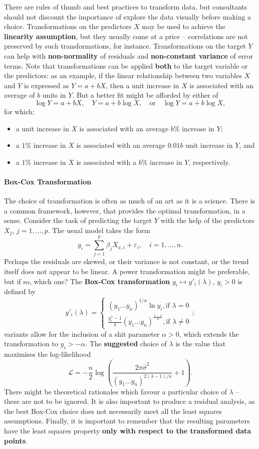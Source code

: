 \afterpage{\FloatBarrier}
There are rules of thumb and best practices to transform data, but consultants should not discount the importance of explore the data visually before making a choice. \newl Transformations on the predictors $X$ may be used to achieve the \textbf{linearity assumption}, but they usually come at a price -- correlations are not preserved by such transformations, for instance. Transformations on the target $Y$ can help with \textbf{non-normality} of residuals and \textbf{non-constant variance} of error terms. Note that transformations can be applied \textbf{both} to the target variable or the predictors: as an example, if the linear relationship between two variables $X$ and $Y$ is expressed as $Y=a+bX$, then a unit increase in $X$ is associated with an average of $b$ units in $Y$. But a better fit might be afforded by either of $$\log Y = a+bX,\quad Y=a+b\log X,\quad \mbox{or}\quad  \log Y = a+b\log X,$$ for which:
\begin{itemize}[noitemsep]
\item a unit increase in $X$ is associated with an average $b\%$ increase in $Y$;
\item a $1\%$ increase in $X$ is associated with an average $0.01b$ unit increase in $Y$, and
\item a $1\%$ increase in $X$ is associated with a $b\%$ increase in $Y$, respectively. 
\end{itemize}
\paragraph{Box-Cox Transformation} The choice of transformation is often as much of an art as it is a science. There is a common  framework, however, that provides the  optimal transformation, in a sense. Consider the task of predicting the target $Y$ with the help of the predictors $X_j$, $j=1,\ldots, p$. The usual model takes the form $$y_i=\sum_{j=1}^p\beta_jX_{x,i}+\varepsilon_i,\quad i=1,\ldots, n.$$ Perhaps the residuals are skewed, or their variance is not constant, or the trend itself does not appear to be linear. A power transformation might be preferable, but if so,  which one? \newl The \textbf{Box-Cox transformation} $y_i\mapsto y'_i(\lambda)$, $y_i>0$ is defined by  $$y'_i(\lambda)=\begin{cases}(y_1 \ldots   y_n)^{1/n}\ln y_i, \text{if }\lambda=0 \\ 
\frac{y_i^{\lambda}-1}{\lambda}(y_1 \ldots   y_n)^{\frac{1-\lambda}{n}}, \text{if }\lambda\neq 0
\end{cases};$$
variants allow for the inclusion of a shit parameter $\alpha>0$, which extends the transformation to $y_i>-\alpha$. The \textbf{suggested} choice of $\lambda$ is the value that maximises the log-likelihood $$\mathcal{L}=-\frac{n}{2}\log\left(\frac{2\pi\hat{\sigma}^2}{(y_1 \ldots   y_n)^{2(\lambda-1)/n}}+1\right).$$
There might be theoretical rationales which favour a particular choice of $\lambda$ -- these are not to be ignored. It is also important to produce a residual analysis, as the best Box-Cox choice does not necessarily meet all the least squares assumptions. Finally, it is important to remember that the resulting parameters have the least squares property \textbf{only with respect to the transformed data points}. 
